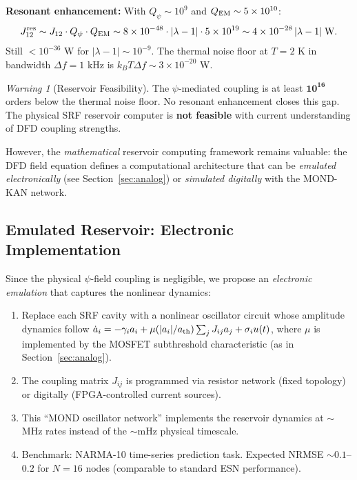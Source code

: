 \documentclass[11pt]{article}
\theoremstyle{definition}
\theoremstyle{remark}
\newtheorem{warning}[theorem]{Warning}
\newcommand{\ee}[1]{\times 10^{#1}}
\begin{document}
\textbf{Resonant enhancement:} With $Q_\psi \sim 10^9$ and
$Q_{\rm EM} \sim 5 \ee{10}$:
\begin{equation}
  J_{12}^{\rm res} \sim J_{12} \cdot Q_\psi \cdot Q_{\rm EM}
  \sim 8 \ee{-48} \cdot |\lambda - 1| \cdot 5 \ee{19}
  \sim 4 \ee{-28}\,|\lambda - 1| \;\text{W}.
  \label{eq:J12-res}
\end{equation}
Still $< 10^{-36}$ W for $|\lambda - 1| \sim 10^{-9}$. The thermal
noise floor at $T = 2$ K in bandwidth $\Delta f = 1$ kHz is
$k_B T \Delta f \sim 3 \ee{-20}$ W.

\begin{warning}[Reservoir Feasibility]
The $\psi$-mediated coupling is at least $\mathbf{10^{16}}$ orders
below the thermal noise floor. No resonant enhancement closes
this gap. The physical SRF reservoir computer is
\textbf{not feasible} with current understanding of DFD coupling
strengths.

However, the \emph{mathematical} reservoir computing framework
remains valuable: the DFD field equation defines a computational
architecture that can be \emph{emulated electronically} (see
Section~\ref{sec:analog}) or \emph{simulated digitally} with the
MOND-KAN network.
\end{warning}

\subsection{Emulated Reservoir: Electronic Implementation}

Since the physical $\psi$-field coupling is negligible, we propose
an \emph{electronic emulation} that captures the nonlinear dynamics:

\begin{enumerate}
\item Replace each SRF cavity with a nonlinear oscillator circuit
  whose amplitude dynamics follow $\dot{a}_i = -\gamma_i a_i +
  \mu(|a_i|/a_{\rm th}) \sum_j J_{ij} a_j + \sigma_i u(t)$,
  where $\mu$ is implemented by the MOSFET subthreshold characteristic
  (as in Section~\ref{sec:analog}).

\item The coupling matrix $J_{ij}$ is programmed via resistor network
  (fixed topology) or digitally (FPGA-controlled current sources).

\item This ``MOND oscillator network'' implements the reservoir
  dynamics at $\sim$MHz rates instead of the $\sim$mHz physical
  timescale.

\item Benchmark: NARMA-10 time-series prediction task. Expected
  NRMSE $\sim 0.1$--$0.2$ for $N = 16$ nodes (comparable to
  standard ESN performance).
\end{enumerate}
\end{document}
